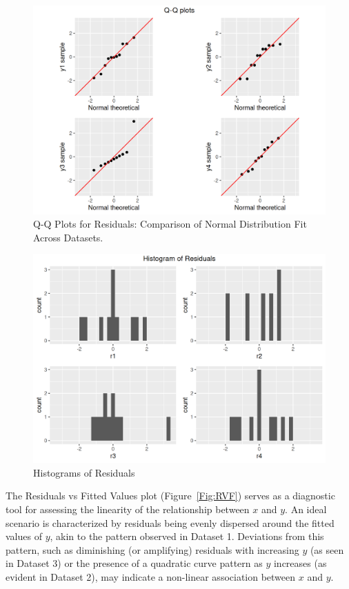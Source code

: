 \documentclass[12pt]{article}
\begin{document}
\begin{figure}[htbp]
\includegraphics[width=.8\textwidth]{QQplot.png}
\centering
\caption{Q-Q Plots for Residuals: Comparison of Normal Distribution Fit Across Datasets.}
\label{Fig:QQplot}
\end{figure}

\begin{figure}[htbp]
\includegraphics[width=.7\textwidth]{histogram.png}
\centering
\caption{Histograms of Residuals}
\label{Fig:Histogram}
\end{figure}

\newpage
The Residuals vs Fitted Values plot (Figure~\ref{Fig:RVF}) serves as a diagnostic tool for assessing the linearity of the relationship between $x$ and $y$. An ideal scenario is characterized by residuals being evenly dispersed around the fitted values of $y$, akin to the pattern observed in Dataset 1. Deviations from this pattern, such as diminishing (or amplifying) residuals with increasing $y$ (as seen in Dataset 3) or the presence of a quadratic curve pattern as $y$ increases (as evident in Dataset 2), may indicate a non-linear association between $x$ and $y$.
\end{document}
